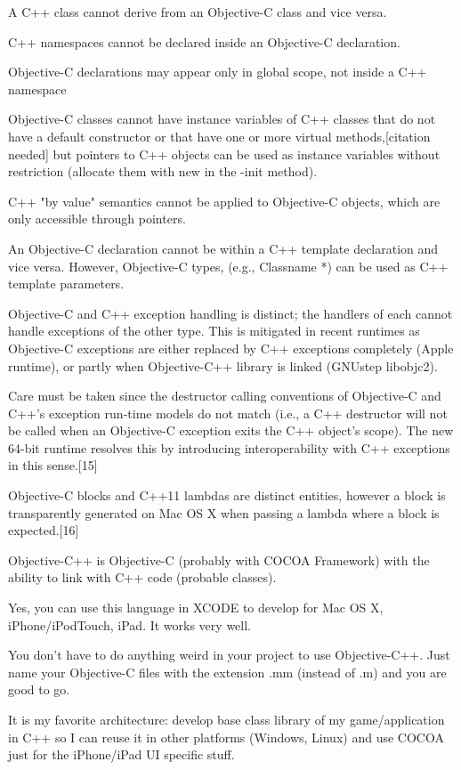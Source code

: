 A C++ class cannot derive from an Objective-C class and vice versa.

C++ namespaces cannot be declared inside an Objective-C declaration.

Objective-C declarations may appear only in global scope, not inside a C++ namespace

Objective-C classes cannot have instance variables of C++ classes that do not have a default constructor or that have one or more virtual methods,[citation needed] but pointers to C++ objects can be used as instance variables without restriction (allocate them with new in the -init method).

C++ "by value" semantics cannot be applied to Objective-C objects, which are only accessible through pointers.

An Objective-C declaration cannot be within a C++ template declaration and vice versa. However, Objective-C types, (e.g., Classname *) can be used as C++ template parameters.

Objective-C and C++ exception handling is distinct; the handlers of each cannot handle exceptions of the other type. This is mitigated in recent runtimes as Objective-C exceptions are either replaced by C++ exceptions completely (Apple runtime), or partly when Objective-C++ library is linked (GNUstep libobjc2).

Care must be taken since the destructor calling conventions of Objective-C and C++’s exception run-time models do not match (i.e., a C++ destructor will not be called when an Objective-C exception exits the C++ object’s scope). The new 64-bit runtime resolves this by introducing interoperability with C++ exceptions in this sense.[15]

Objective-C blocks and C++11 lambdas are distinct entities, however a block is transparently generated on Mac OS X when passing a lambda where a block is expected.[16]

Objective-C++ is Objective-C (probably with COCOA Framework) with the ability to link with C++ code (probable classes).

\vpara
Yes, you can use this language in XCODE to develop for Mac OS X, iPhone/iPodTouch, iPad. It works very well.

You don't have to do anything weird in your project to use Objective-C++. Just name your Objective-C files with the extension .mm (instead of .m) and you are good to go.

\vpara
It is my favorite architecture: develop base class library of my game/application in C++ so I can reuse it in other platforms (Windows, Linux) and use COCOA just for the iPhone/iPad UI specific stuff.



